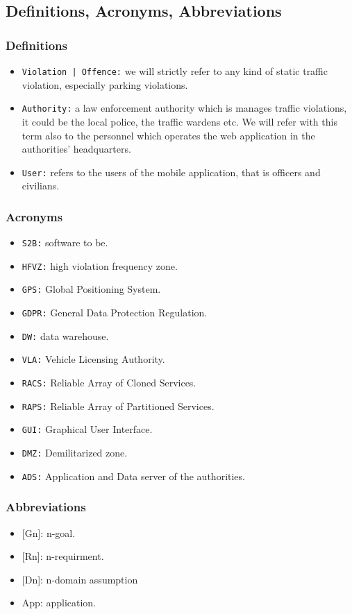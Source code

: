 \documentclass[12pt,a4paper]{article}
\begin{document}
\subsection{Definitions, Acronyms, Abbreviations}
\subsubsection{Definitions}
\begin{itemize}
\item \texttt{Violation | Offence:} we will strictly refer to any kind of static traffic violation, especially parking violations. 
\item \texttt{Authority:} a law enforcement authority which is manages traffic violations, it could be the local police, the traffic wardens etc. We will refer with this term also to the personnel which operates the web application in the authorities' headquarters.
\item \texttt{User:} refers to the users of the mobile application, that is officers and civilians.
\end{itemize}
\subsubsection{Acronyms}
\begin{itemize}
\item \texttt{S2B:} software to be.
\item \texttt{HFVZ:} high violation frequency zone.
\item \texttt{GPS:} Global Positioning System.
\item \texttt{GDPR:} General Data Protection Regulation.
\item \texttt{DW:} data warehouse.
\item \texttt{VLA:} Vehicle Licensing Authority.
\item \texttt{RACS:} Reliable Array of Cloned Services.
\item \texttt{RAPS:} Reliable Array of Partitioned Services.
\item \texttt{GUI:} Graphical User Interface.
\item \texttt{DMZ:} Demilitarized zone.
\item \texttt{ADS:} Application and Data server of the authorities.
\end{itemize}
\subsubsection{Abbreviations}
\begin{itemize}
	\item {[Gn]}: n-goal.
	\item {[Rn]}: n-requirment.
	\item {[Dn]}: n-domain assumption
	\item {App}: application.
\end{itemize}
\end{document}
